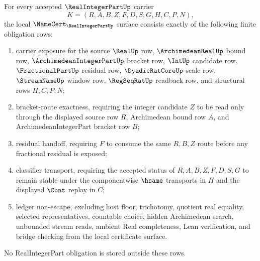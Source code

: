 \begin{theorem}
\label{thm:real-integer-part-namecert-obligations}
For every accepted $\RealIntegerPartUp$ carrier
$$
K=(R,A,B,Z,F,D,S,G,H,C,P,N),
$$
the local $\NameCert_{\RealIntegerPartUp}$ surface consists exactly of the following finite obligation rows:
\begin{enumerate}
\item carrier exposure for the source $\RealUp$ row, $\ArchimedeanRealUp$ bound row, $\ArchimedeanIntegerPartUp$ bracket row, $\IntUp$ candidate row, $\FractionalPartUp$ residual row, $\DyadicRatCoreUp$ scale row, $\StreamNameUp$ window row, $\RegSeqRatUp$ readback row, and structural rows $H,C,P,N$;
\item bracket-route exactness, requiring the integer candidate $Z$ to be read only through the displayed source row $R$, Archimedean bound row $A$, and ArchimedeanIntegerPart bracket row $B$;
\item residual handoff, requiring $F$ to consume the same $R,B,Z$ route before any fractional residual is exposed;
\item classifier transport, requiring the accepted status of $R,A,B,Z,F,D,S,G$ to remain stable under the componentwise $\hsame$ transports in $H$ and the displayed $\Cont$ replay in $C$;
\item ledger non-escape, excluding host floor, trichotomy, quotient real equality, selected representatives, countable choice, hidden Archimedean search, unbounded stream reads, ambient Real completeness, Lean verification, and bridge checking from the local certificate surface.
\end{enumerate}
No RealIntegerPart obligation is stored outside these rows.
\end{theorem}
